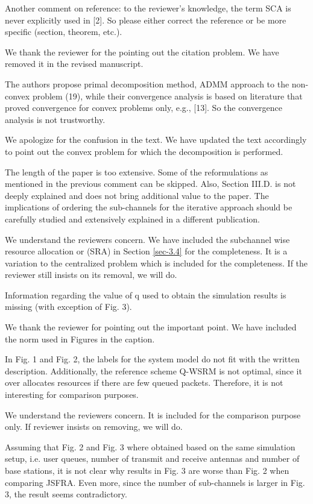  Another comment on reference: to the reviewer's knowledge, the term SCA is never explicitly used in [2]. So please either correct the reference or be more specific (section, theorem, etc.).

\resp We thank the reviewer for the pointing out the citation problem. We have removed it in the revised manuscript.

 The authors propose primal decomposition method, ADMM approach to the non-convex problem (19), while their convergence analysis is based on literature that proved convergence for convex problems only, e.g., [13]. So the convergence analysis is not trustworthy.

\resp We apologize for the confusion in the text. We have updated the text accordingly to point out the convex problem for which the decomposition is performed.

 The length of the paper is too extensive. Some of the reformulations as mentioned in the previous comment can be skipped. Also, Section III.D. is not deeply explained and does not bring additional value to the paper. The implications of ordering the sub-channels for the iterative approach should be carefully studied and extensively explained in a different publication.

\resp We understand the reviewers concern. We have included the subchannel wise resource allocation or (SRA) in Section \ref{sec-3.4} for the completeness. It is a variation to the centralized problem which is included for the completeness. If the reviewer still insists on its removal, we will do.

 Information regarding the value of q used to obtain the simulation results is missing (with exception of Fig. 3).

\resp We thank the reviewer for pointing out the important point. We have included the norm used in Figures in the caption.

 In Fig. 1 and Fig. 2, the labels for the system model do not fit with the written description. Additionally, the reference scheme Q-WSRM is not optimal, since it over allocates resources if there are few queued packets. Therefore, it is not interesting for comparison purposes.

\resp We understand the reviewers concern. It is included for the comparison purpose only. If reviewer insists on removing, we will do.

 Assuming that Fig. 2 and Fig. 3 where obtained based on the same simulation setup, i.e. user queues, number of transmit and receive antennas and number of base stations, it is not clear why results in Fig. 3 are worse than Fig. 2 when comparing JSFRA. Even more, since the number of sub-channels is larger in Fig. 3, the result seems contradictory.

